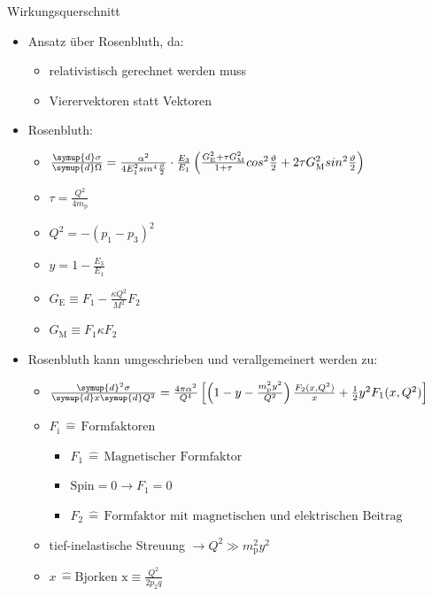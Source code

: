 \documentclass[aspectratio=1610, 9pt]{beamer}
\begin{document}
\begin{frame}{Wirkungsquerschnitt}
\begin{itemize}
  \item{Ansatz über Rosenbluth, da:}
  \begin{itemize}
    \item{relativistisch gerechnet werden muss}
    \item{Vierervektoren statt Vektoren}
  \end{itemize}
  \item{Rosenbluth:}
  \begin{itemize}
    \item{ $ \frac{\symup{d} \sigma}{\symup{d} \Omega }  = \frac{\alpha^2}{4 E^2_1 sin^4{\frac{\vartheta}{2}}} \cdot \frac{E_3}{E_1} \left( \frac{G^2_\text{E}+ \tau G^2_\text{M}}{1+\tau} cos^2{\frac{\vartheta}{2}} +2\tau G^2_\text{M} sin^2{\frac{\vartheta}{2}} \right) $}
    \item{ $ \tau = \frac{Q^2}{4m_\text{p}} $ }
    \item{ $ Q^2 = -(p_1-p_3)^2$ }
    \item{ $y = 1-\frac{E_3}{E_1} $ }
    \item{$G_\text{E} \equiv F_1 - \frac{\kappa Q^2}{M^2} F_2 $}
    \item{$G_\text{M} \equiv F_1 \kappa F_2 $}
  \end{itemize}
\end{itemize}
\end{frame}

\begin{frame}
  \begin{itemize}
  \item{Rosenbluth kann umgeschrieben und verallgemeinert werden zu: }
  \begin{itemize}
    \item{$ \frac{\symup{d}^2\sigma}{ \symup{d}x \symup{d}Q^2} = \frac{4 \pi \alpha^2}{Q^4} \left[ \left( 1 - y - \frac{m^2_\text{p} y^2}{Q^2} \right) \frac{F_2(x, Q^2)}{x} + \frac{1}{2}y^2F_1(x, Q^2) \right]  $}
    \item{$F_\text{i} \,\hat{=} \, \text{Formfaktoren} $}
    \begin{itemize}
      \item{$F_1 \,\hat{=} \, \text{Magnetischer Formfaktor} $}
      \item{$\text{Spin} = 0 \rightarrow F_1 = 0$}
      \item{$F_2 \,\hat{=} \, \text{Formfaktor mit magnetischen und elektrischen Beitrag} $}
    \end{itemize}
    \item{tief-inelastische Streuung $\rightarrow Q^2 \gg  m^2_\text{p} y^2 $}
    \item{$x \,\hat{=} \text{Bjorken x} \equiv \frac{Q^2}{2 p_2 q} $}
  \end{itemize}
  \end{itemize}
\end{frame}
\end{document}
